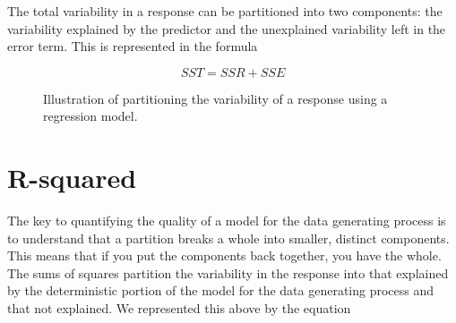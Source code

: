 \documentclass[
  letterpaper,
  DIV=11,
  numbers=noendperiod]{scrreprt}
\theoremstyle{definition}
\theoremstyle{definition}
\theoremstyle{plain}
\theoremstyle{remark}
\begin{document}
\begin{tcolorbox}[enhanced jigsaw, colbacktitle=quarto-callout-tip-color!10!white, colback=white, left=2mm, title=\textcolor{quarto-callout-tip-color}{\faLightbulb}\hspace{0.5em}{Big Idea}, toptitle=1mm, leftrule=.75mm, breakable, bottomrule=.15mm, arc=.35mm, rightrule=.15mm, toprule=.15mm, coltitle=black, opacityback=0, colframe=quarto-callout-tip-color-frame, opacitybacktitle=0.6, bottomtitle=1mm, titlerule=0mm]

The total variability in a response can be partitioned into two
components: the variability explained by the predictor and the
unexplained variability left in the error term. This is represented in
the formula

\[SST = SSR + SSE\]

\end{tcolorbox}

\begin{figure}


\caption{\label{fig-regquality-partition-variability}Illustration of
partitioning the variability of a response using a regression model.}

\end{figure}%

\section{R-squared}\label{r-squared}

The key to quantifying the quality of a model for the data generating
process is to understand that a partition breaks a whole into smaller,
distinct components. This means that if you put the components back
together, you have the whole. The sums of squares partition the
variability in the response into that explained by the deterministic
portion of the model for the data generating process and that not
explained. We represented this above by the equation
\end{document}
